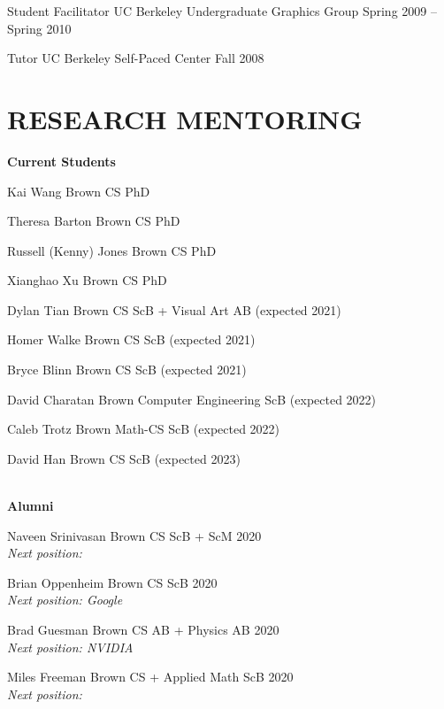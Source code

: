 \documentclass[line,margin]{res}
\begin{document}
\begin{resume}
\teach
{Student Facilitator}
{UC Berkeley Undergraduate Graphics Group}
{Spring 2009 -- Spring 2010}

\teach
{Tutor}
{UC Berkeley Self-Paced Center}
{Fall 2008}


\section{RESEARCH MENTORING}

\newcommand{\currentphd}[2] {
	#1 \hfill #2
}

\newcommand{\student}[3] {
	#1 \hfill #2 (expected #3)
}

\newcommand{\alumni}[4] {
	#1 \hfill #2 #3\\
	\emph{Next position: #4}
}

\newcommand{\visitor}[4] {
	#1 \hfill #2 #3\\
	\emph{Home institution: #4}
}


\textbf{Current Students}

\currentphd
{Kai Wang}
{Brown CS PhD}

\currentphd
{Theresa Barton}
{Brown CS PhD}

\currentphd
{Russell (Kenny) Jones}
{Brown CS PhD}

\currentphd
{Xianghao Xu}
{Brown CS PhD}

\student
{Dylan Tian}
{Brown CS ScB + Visual Art AB}
{2021}

\student
{Homer Walke}
{Brown CS ScB}
{2021}

\student
{Bryce Blinn}
{Brown CS ScB}
{2021}	

\student
{David Charatan}
{Brown Computer Engineering ScB}
{2022}

\student
{Caleb Trotz}
{Brown Math-CS ScB}
{2022}

\student
{David Han}
{Brown CS ScB}
{2023}
\\


\textbf{Alumni}

\alumni
{Naveen Srinivasan}
{Brown CS ScB + ScM}
{2020}
{}

\alumni
{Brian Oppenheim}
{Brown CS ScB}
{2020}
{Google}

\alumni
{Brad Guesman}
{Brown CS AB + Physics AB}
{2020}
{NVIDIA}

\alumni
{Miles Freeman}
{Brown CS + Applied Math ScB}
{2020}
{}


\end{resume}
\end{document}
